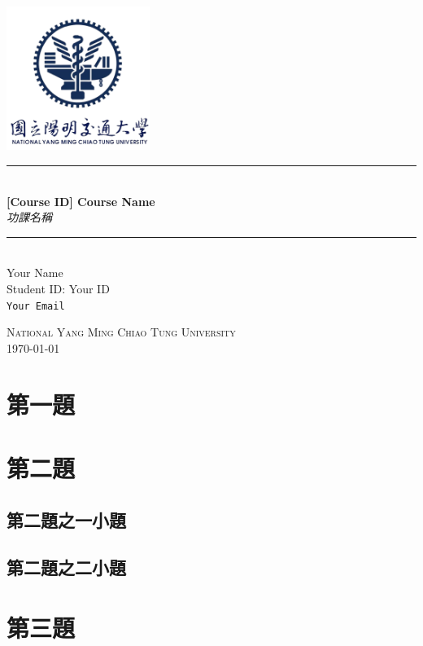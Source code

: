 \documentclass[book, oneside, 12pt]{article}
\newcommand{\HRule}{\rule{\linewidth}{0.5mm}}
\begin{document}
\begin{CJK*}{UTF8}{bkai}
\begin{titlepage}
\begin{center}

\includegraphics[width=0.35\textwidth]{nycu}~\\[2cm]


\HRule \\[0.4cm]
{ \LARGE 
  \textbf{\Large{[Course ID] Course Name}}\\[0.4cm]
  \emph{功課名稱}\\[0.4cm]
}
\HRule \\[1.8cm]



{ \large
  Your Name \\[0.1cm]
  Student ID: Your ID\\[0.1cm]
  \texttt{Your Email}
}

\vfill

\textsc{\Large National Yang Ming Chiao Tung University}\\[0.4cm]


{\large \today}
 
\end{center}
\end{titlepage}

\tableofcontents
\newpage

\section{第一題}

\section{第二題}

\subsection{第二題之一小題}

\subsection{第二題之二小題}

\section{第三題}

\end{CJK*}
\end{document}
